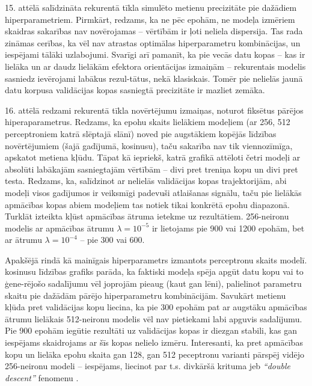 \documentclass[12pt, a4paper]{article}
\numberwithin{equation}{section} %
\begin{document}
15. attēlā salīdzināta rekurentā tīkla simulēto metienu precizitāte pie dažādiem hiperparametriem. Pirmkārt, redzams, ka ne pēc epohām, ne modeļa izmēriem skaidras sakarības nav novērojamas -- vērtībām ir ļoti neliela dispersija. Tas rada zināmas cerības, ka vēl nav atrastas optimālas hiperparametru kombinācijas, un iespējami tālāki uzlabojumi. Svarīgi arī pamanīt, ka pie vecās datu kopas -- kas ir lielāka un ar daudz lielākām efektora orientācijas izmaiņām -- rekurentais modelis sasniedz ievērojami labākus rezul-tātus, nekā klasiskais. Tomēr pie nelielās jaunā datu korpusa validācijas kopas sasniegtā precizitāte ir mazliet zemāka.


16. attēlā redzami rekurentā tīkla novērtējumu izmaiņas, noturot fiksētus pārējos hiperaparametrus. Redzams, ka epohu skaits lielākiem modeļiem (ar 256, 512 perceptroniem katrā slēptajā slānī) noved pie augstākiem kopējās līdzības novērtējumiem (šajā gadījumā, kosinusu), taču sakarība nav tik viennozīmīga, apskatot metiena kļūdu. Tāpat kā iepriekš, katrā grafikā attēloti četri modeļi ar absolūti labākajām sasniegtajām vērtībām -- divi pret treniņa kopu un divi pret testa. Redzams, ka, salīdzinot ar nelielās validācijas kopas trajektorijām, abi modeļi visos gadījumos ir veiksmīgi padevuši atlaišanas signālu, taču pie lielākās apmācības kopas abiem modeļiem tas notiek tikai konkrētā epohu diapazonā. Turklāt izteikta kļūst apmācības ātruma ietekme uz rezultātiem. 256-neironu modelis ar apmācības ātrumu $\lambda = 10^{-5}$ ir lietojams pie 900 vai 1200 epohām, bet ar ātrumu $\lambda = 10^{-4}$ -- pie 300 vai 600. 

Apakšējā rindā kā mainīgais hiperparametrs izmantots perceptronu skaits modelī. kosinusu līdzības grafiks parāda, ka faktiski modeļa spēja apgūt datu kopu vai to ģene-rējošo sadalījumu vēl joprojām pieaug (kaut gan lēni), palielinot parametru skaitu pie dažādām pārējo hiperparametru kombinācijām. Savukārt metienu kļūda pret validācijas kopu liecina, ka pie 300 epohām pat ar augstāku apmācības ātrumu lielākais 512-neironu modelis vēl nav pietiekami labi apguvis sadalījumu. Pie 900 epohām iegūtie rezultāti uz validācijas kopas ir diezgan stabili, kas gan iespējams skaidrojams ar šīs kopas nelielo izmēru. Interesanti, ka pret apmācības kopu un lielāka epohu skaita gan 128, gan 512 peceptronu varianti pārspēj vidējo 256-neironu modeli -- iespējams, liecinot par t.s. divkāršā krituma jeb \textit{``double descent''} fenomenu \cite{nakkiran2021deep}.


%
%
%
%
%
%
%
%
%
%
%
%
%
%
%
%
%
%
%
\end{document}
